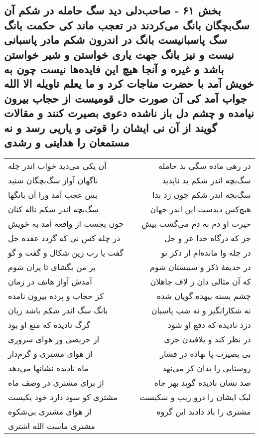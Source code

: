 \begin{center}
\section*{بخش ۶۱ - صاحب‌دلی دید سگ حامله در شکم آن سگ‌بچگان بانگ می‌کردند در تعجب ماند کی حکمت بانگ سگ پاسبانیست بانگ در اندرون شکم مادر پاسبانی نیست و نیز بانگ جهت یاری خواستن و شیر خواستن باشد و غیره و آنجا هیچ این فایده‌ها نیست چون به خویش آمد با حضرت مناجات کرد و ما یعلم تاویله الا الله جواب آمد کی آن صورت حال قومیست از حجاب بیرون نیامده و چشم دل باز ناشده دعوی بصیرت کنند و مقالات گویند از آن نی ایشان را قوتی و یاریی رسد و نه مستمعان را هدایتی  و رشدی}
\label{sec:sh061}
\begin{longtable}{l p{0.5cm} r}
آن یکی می‌دید خواب اندر چله
&&
در رهی ماده سگی بد حامله
\\
ناگهان آواز سگ‌بچگان شنید
&&
سگ‌بچه اندر شکم بد ناپدید
\\
بس عجب آمد ورا آن بانگها
&&
سگ‌بچه اندر شکم چون زد ندا
\\
سگ‌بچه اندر شکم ناله کنان
&&
هیچ‌کس دیدست این اندر جهان
\\
چون بجست از واقعه آمد به خویش
&&
حیرت او دم به دم می‌گشت بیش
\\
در چله کس نی که گردد عقده حل
&&
جز که درگاه خدا عز و جل
\\
گفت یا رب زین شکال و گفت و گو
&&
در چله وا مانده‌ام از ذکر تو
\\
پر من بگشای تا پران شوم
&&
در حدیقهٔ ذکر و سیبستان شوم
\\
آمدش آواز هاتف در زمان
&&
که آن مثالی دان ز لاف جاهلان
\\
کز حجاب و پرده بیرون نامده
&&
چشم بسته بیهده گویان شده
\\
بانگ سگ اندر شکم باشد زیان
&&
نه شکارانگیز و نه شب پاسبان
\\
گرگ نادیده که منع او بود
&&
دزد نادیده که دفع او شود
\\
از حریصی وز هوای سروری
&&
در نظر کند و بلافیدن جری
\\
از هوای مشتری و گرم‌دار
&&
بی بصیرت پا نهاده در فشار
\\
ماه نادیده نشانها می‌دهد
&&
روستایی را بدان کژ می‌نهد
\\
از برای مشتری در وصف ماه
&&
صد نشان نادیده گوید بهر جاه
\\
مشتری کو سود دارد خود یکیست
&&
لیک ایشان را درو ریب و شکیست
\\
از هوای مشتری بی‌شکوه
&&
مشتری را باد دادند این گروه
\\
مشتری ماست الله اشتری

\end{longtable}
\end{center}
